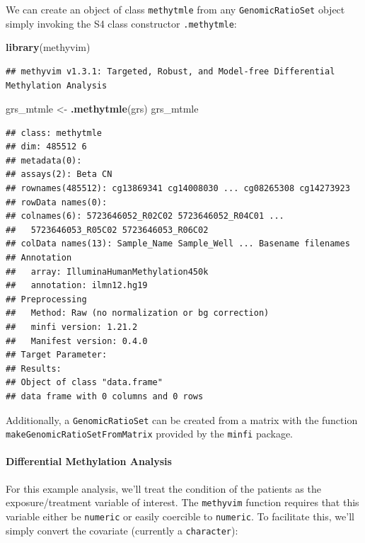 \documentclass[9pt,a4paper,]{extarticle}
\newenvironment{Shaded}{\begin{snugshade}}{\end{snugshade}}
\newcommand{\KeywordTok}[1]{\textcolor[rgb]{0.13,0.29,0.53}{\textbf{#1}}}
\newcommand{\NormalTok}[1]{#1}
\newcommand{\StringTok}[1]{\textcolor[rgb]{0.31,0.60,0.02}{#1}}
\theoremstyle{definition}
\theoremstyle{definition}
\theoremstyle{definition}
\theoremstyle{remark}
\begin{document}
We can create an object of class \texttt{methytmle} from any \texttt{GenomicRatioSet} object
simply invoking the S4 class constructor \texttt{.methytmle}:

\begin{Shaded}
\begin{Highlighting}[]
\KeywordTok{library}\NormalTok{(methyvim)}
\end{Highlighting}
\end{Shaded}

\begin{verbatim}
## methyvim v1.3.1: Targeted, Robust, and Model-free Differential Methylation Analysis
\end{verbatim}

\begin{Shaded}
\begin{Highlighting}[]
\NormalTok{grs_mtmle <-}\StringTok{ }\KeywordTok{.methytmle}\NormalTok{(grs)}
\NormalTok{grs_mtmle}
\end{Highlighting}
\end{Shaded}

\begin{verbatim}
## class: methytmle 
## dim: 485512 6 
## metadata(0):
## assays(2): Beta CN
## rownames(485512): cg13869341 cg14008030 ... cg08265308 cg14273923
## rowData names(0):
## colnames(6): 5723646052_R02C02 5723646052_R04C01 ...
##   5723646053_R05C02 5723646053_R06C02
## colData names(13): Sample_Name Sample_Well ... Basename filenames
## Annotation
##   array: IlluminaHumanMethylation450k
##   annotation: ilmn12.hg19
## Preprocessing
##   Method: Raw (no normalization or bg correction)
##   minfi version: 1.21.2
##   Manifest version: 0.4.0
## Target Parameter: 
## Results: 
## Object of class "data.frame"
## data frame with 0 columns and 0 rows
\end{verbatim}

Additionally, a \texttt{GenomicRatioSet} can be created from a matrix with the
function \texttt{makeGenomicRatioSetFromMatrix} provided by the \texttt{minfi} package.

\hypertarget{differential-methylation-analysis}{%
\paragraph{Differential Methylation Analysis}\label{differential-methylation-analysis}}

For this example analysis, we'll treat the condition of the patients as the
exposure/treatment variable of interest. The \texttt{methyvim} function requires that
this variable either be \texttt{numeric} or easily coercible to \texttt{numeric}. To
facilitate this, we'll simply convert the covariate (currently a \texttt{character}):
\end{document}

